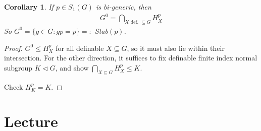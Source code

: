 \documentclass[]{article}
\theoremstyle{custhm}
\theoremstyle{cusdef}
\theoremstyle{custhm}
\theoremstyle{custhm}
\newtheorem{cor}[theorem]{Corollary}
\theoremstyle{custhm}
\theoremstyle{ex}
\theoremstyle{custhm}
\theoremstyle{cusdef}
\theoremstyle{remark}
\theoremstyle{remark}
\theoremstyle{numremark}
\begin{document}
\begin{cor}
	If $p \in S_1(G)$ is bi-generic, then
	\begin{align*}
		G^0 = \bigcap_{X\textrm{ def. }\subseteq G}H^p_X
	\end{align*}
	So $G^0 = \{g\in G: gp = p\}=:$ \emph{Stab}$(p)$.
\end{cor}
\begin{proof}
	$G^0 \le H^p_X$ for all definable $X\subseteq G$, so it must also lie within their intersection. For the other direction, it suffices to fix definable finite index normal subgroup $K\triangleleft G$, and show $\bigcap_{X\subseteq G}H^p_X \le K$.

	Check $H^p_K = K$.
\end{proof}

\section{Lecture}
\end{document}
